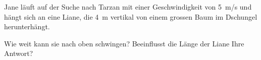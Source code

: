 \begin{aufgabe}

Jane läuft auf der Suche nach Tarzan mit einer Geschwindigkeit von \SI{5}{m/s} und hängt sich an eine Liane,
die \SI{4}{m} vertikal von einem grossen Baum im Dschungel herunterhängt.

Wie weit kann sie nach oben schwingen? Beeinflusst die Länge der Liane Ihre Antwort?


\end{aufgabe}
